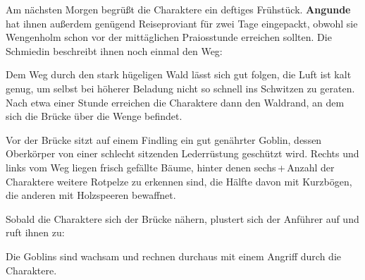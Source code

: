 %




Am nächsten Morgen begrüßt die Charaktere ein deftiges Frühstück.
\textbf{Angunde} hat ihnen außerdem genügend Reiseproviant für zwei Tage eingepackt, obwohl sie Wengenholm schon vor der mittäglichen Praiosstunde erreichen sollten.
Die Schmiedin beschreibt ihnen noch einmal den Weg:

Dem Weg durch den stark hügeligen Wald lässt sich gut folgen, die Luft ist kalt genug, um selbst bei höherer Beladung nicht so schnell ins Schwitzen zu geraten.
Nach etwa einer Stunde erreichen die Charaktere dann den Waldrand, an dem sich die Brücke über die Wenge befindet.

Vor der Brücke sitzt auf einem Findling ein gut genährter Goblin, dessen Oberkörper von einer schlecht sitzenden Lederrüstung geschützt wird. Rechts und links vom Weg liegen frisch gefällte Bäume, hinter denen sechs\,+\,Anzahl der Charaktere weitere Rotpelze zu erkennen sind, die Hälfte davon mit Kurzbögen, die anderen mit Holzspeeren bewaffnet.

Sobald die Charaktere sich der Brücke nähern, plustert sich der Anführer auf und ruft ihnen zu:

Die Goblins sind wachsam und rechnen durchaus mit einem Angriff durch die Charaktere.




